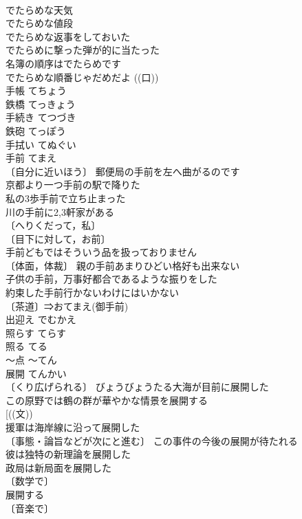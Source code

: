 \documentclass[8pt]{extreport}
\begin{document}
\begin{CJK}{UTF8}{min}
\\	でたらめな天気 
\\	でたらめな値段 
\\	でたらめな返事をしておいた 
\\	でたらめに撃った弾が的に当たった 
\\	名簿の順序はでたらめです 
\\	でたらめな順番じゃだめだよ ((口)) 
\\	手帳	てちょう	
\\	鉄橋	てっきょう	
\\	手続き	てつづき	
\\	鉄砲	てっぽう	
\\	手拭い	てぬぐい	
\\	手前	てまえ	
\\	〔自分に近いほう〕 郵便局の手前を左へ曲がるのです 
\\	京都より一つ手前の駅で降りた 
\\	私の3歩手前で立ち止まった 
\\	川の手前に2,3軒家がある 
\\	〔へりくだって，私〕
\\	〔目下に対して，お前〕
\\	手前どもではそういう品を扱っておりません 
\\	〔体面，体裁〕 親の手前あまりひどい格好も出来ない 
\\	子供の手前，万事好都合であるような振りをした 
\\	約束した手前行かないわけにはいかない 
\\	〔茶道〕⇒おてまえ(御手前)
\\	出迎え	でむかえ	
\\	照らす	てらす	
\\	照る	てる	
\\	～点	～てん	
\\	展開	てんかい	
\\	〔くり広げられる〕 びょうびょうたる大海が目前に展開した 
\\	この原野では鶴の群が華やかな情景を展開する 
\\	[((文))
\\	援軍は海岸線に沿って展開した 
\\	〔事態・論旨などが次にと進む〕 この事件の今後の展開が待たれる 
\\	彼は独特の新理論を展開した 
\\	政局は新局面を展開した 
\\	〔数学で〕
\\	展開する 
\\	〔音楽で〕

\end{CJK}
\end{document}
